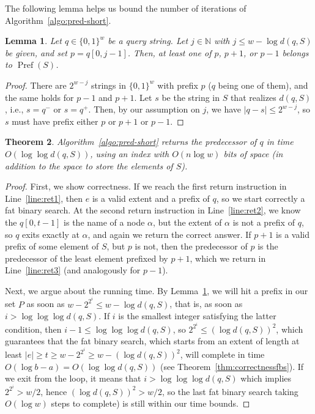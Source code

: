 \documentclass[a4paper,11pt]{article}
\newtheorem{theorem}{Theorem}[section]
\newtheorem{lemma}[theorem]{Lemma}
\newcommand{\N}{\mathbb{N}}
\newcommand{\?}{\mskip1.5mu}
\DeclareMathOperator{\Pref}{Pref}
\begin{document}
The following lemma helps us bound the number of
iterations of Algorithm~\ref{algo:pred-short}.
\begin{lemma}
\label{lemma:hitpref}
Let $q \in \{0, 1\}^w$ be a query string.
Let $j \in \N$ with $j \leq w-\log d(q,S)$ be given, 
and set $p=q[0,j - 1]$. 
Then, at least one of $p$, $p+1$, or $p-1$ 
belongs to $\Pref(S)$. 
\end{lemma}

\begin{proof}
There are $2^{w-j}$ strings in $\{0, 1\}^w$
with prefix $p$ ($q$ being one of them), and the same holds
for $p - 1$ and $p + 1$. 
Let $s$ be the string in $S$ that realizes
$d(q, S)$, i.e., $s = q^-$ or $ s = q^+$.
Then, by our assumption on $j$, we have $|q-s| \leq 2^{w-j}$, 
so $s$ must have prefix either $p$ or $p + 1$ or $p-1$.
\end{proof}


\begin{theorem}
Algorithm~\ref{algo:pred-short} returns the predecessor of $q$
in time $O(\log\log d(q,S))$, using an index with 
$O(n \log w)$ bits of space (in addition to the space 
to store the elements of $S$).
\end{theorem}

\begin{proof}
First, we show correctness. If we reach the first return
instruction in Line~\ref{line:ret1}, then $e$ is a valid 
extent and a prefix of $q$, so we start correctly a
fat binary search. At the second return instruction
in Line~\ref{line:ret2}, we know the $q[0, t - 1]$ is
the name of a node $\alpha$, but the extent of 
$\alpha$ is not a prefix of $q$, so
$q$ exits exactly at $\alpha$, and again we return the correct answer. 
If $p + 1$ is a valid prefix of some element of $S$, but $p$ is not, 
then the predecessor
of $p$ is the predecessor of the least element prefixed by $p + 1$, which we
return in Line~\ref{line:ret3} (and analogously for $p - 1$).

Next, we argue about the running time.
By Lemma~\ref{lemma:hitpref}, we will hit a prefix in our set $P$ as soon as
$w - 2^{2^i} \leq w - \log d(q,S)$, that is, as soon as 
$i > \log\log\log d(q, S)$. If $i$ is the
smallest integer satisfying the latter condition, then 
$i - 1 \leq \log\log\log d(q, S)$, so $2^{2^i} \leq (\log d(q, S))^2$, 
which guarantees that the fat binary
search, which starts from an extent of length at least $|e| \geq t \geq
w - 2^{2^i} \geq w - (\log d(q, S))^2$, will complete in time 
$O(\log b - a)=O(\log\log d(q, S))$ (see Theorem~\ref{thm:correctnessfbs}). 
If we exit from the loop,
it means that $i > \log\log\log d(q, S)$ which implies $2^{2^i}>w/2$, hence
$(\log d(q,S))^2>w/2$, so the last fat binary search  taking $O(\log w)$
steps to complete) is still within our time bounds.
\end{proof}
\end{document}
